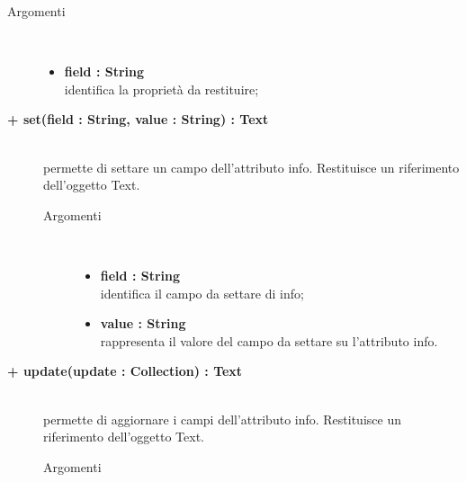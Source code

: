 \begin{description}
\begin{description}
		\begin{description}
			\item[Argomenti] \hfill \\
				\begin{itemize}
				
					\item \textbf{field : String			} \hfill \\
					identifica la proprietà da restituire;
				\end{itemize}
		\end{description}

\end{description}


		\begin{description}
		\item[\textbf{\color{blue}+ set(field : String, value : String) : Text			}] \hfill \\
			permette di settare un campo dell'attributo info. Restituisce un riferimento dell'oggetto Text.
			
		\begin{description}
			\item[Argomenti] \hfill \\
				\begin{itemize}
				
					\item \textbf{field : String			} \hfill \\
					identifica il campo da settare di info;
					\item \textbf{value : String			} \hfill \\
					rappresenta il valore del campo da settare su l'attributo info.
				\end{itemize}
		\end{description}

\end{description}

\begin{description}
		\item[\textbf{\color{blue}+ update(update : Collection) : Text			}] \hfill \\
			permette di aggiornare i campi dell'attributo info. Restituisce un riferimento dell'oggetto Text.
			
		\begin{description}
			\item[Argomenti] \hfill \\
				\begin{itemize}
				

\end{itemize}
\end{description}
\end{description}
\end{description}
